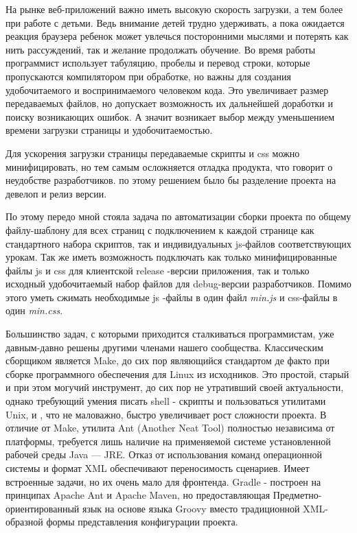 На рынке веб-приложений важно иметь высокую скорость загрузки, а тем более при работе с детьми. Ведь внимание детей трудно удерживать, а пока ожидается реакция браузера ребенок может увлечься посторонними мыслями и потерять как нить рассуждений, так и желание продолжать обучение. 
Во время работы программист использует табуляцию, пробелы и перевод строки, которые пропускаются компилятором при обработке, но важны для создания удобочитаемого и воспринимаемого человеком кода. Это увеличивает размер передаваемых файлов, но допускает возможность их дальнейшей доработки и поиску возникающих ошибок. А значит возникает выбор между уменьшением времени загрузки страницы и удобочитаемостью.

Для ускорения загрузки страницы передаваемые скрипты и css можно минифицировать, но тем самым осложняется отладка продукта, что говорит о неудобстве разработчиков. по этому решением было бы разделение проекта на девелоп и релиз версии.

По этому передо мной стояла задача по автоматизации сборки проекта по общему файлу-шаблону для всех страниц с подключением к каждой странице как стандартного набора скриптов, так и индивидуальных js-файлов соответствующих урокам. Так же иметь возможность подключать как только минифицированные файлы js и css для клиентской release -версии приложения, так и  только исходный удобочитаемый набор файлов для debug-версии разработчиков. Помимо этого уметь сжимать необходимые js -файлы в один файл \textit{min.js} и css-файлы в один \textit{min.css}.

Большинство задач, с которыми приходится сталкиваться программистам, уже давным-давно решены другими членами нашего сообщества. Классическим сборщиком является Make, до сих пор являющийся стандартом де факто при сборке программного обеспечения для Linux из исходников. Это простой, старый и при этом могучий инструмент, до сих пор не утративший своей актуальности, однако требующий умения писать shell - скрипты и пользоваться утилитами Unix, и , что не маловажно, быстро увеличивает рост сложности проекта. В отличие от Make, утилита Ant (Another Neat Tool)  полностью независима от платформы, требуется лишь наличие на применяемой системе установленной рабочей среды Java — JRE. Отказ от использования команд операционной системы и формат XML обеспечивают переносимость сценариев. Имеет встроенные задачи, но их очень мало для фронтенда. Gradle - построен на принципах Apache Ant и Apache Maven, но предоставляющая Предметно-ориентированный язык на основе языка Groovy вместо традиционной XML-образной формы представления конфигурации проекта.

